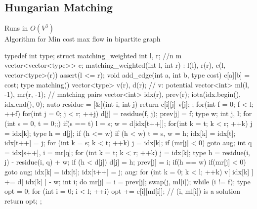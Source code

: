 \documentclass[10pt, landscape, twocolumn, a4paper, notitlepage]{article}
\begin{document}
\subsection{Hungarian Matching}
Runs in $O(V^3)$ \\
Algorithm for Min cost max flow in bipartite graph
\begin{code}
typedef int type;
struct matching_weighted {
  int l, r; //n m
  vector<vector<type>> c;
  matching_weighted(int l, int r) : l(l), r(r), c(l, vector<type>(r)) {
    assert(l <= r);
  }
  void add_edge(int a, int b, type cost) { c[a][b] = cost; }
  type matching() {
    vector<type> v(r), d(r); // v: potential
    vector<int> ml(l, -1), mr(r, -1); // matching pairs
    vector<int> idx(r), prev(r);
    iota(idx.begin(), idx.end(), 0);
    auto residue = [&](int i, int j) { return c[i][j]-v[j]; };
    for(int f = 0; f < l; ++f) {
      for(int j = 0; j < r; ++j) {
        d[j] = residue(f, j);
        prev[j] = f;
      }
      type w;
      int j, l;
      for (int s = 0, t = 0;;) {
        if(s == t) {
          l = s;
          w = d[idx[t++]];
          for(int k = t; k < r; ++k) {
            j = idx[k];
            type h = d[j];
            if (h <= w) {
              if (h < w) t = s, w = h;
              idx[k] = idx[t];
              idx[t++] = j;
            }
          }
          for (int k = s; k < t; ++k) {
            j = idx[k];
            if (mr[j] < 0) goto aug;
          }
        }
        int q = idx[s++], i = mr[q];
        for (int k = t; k < r; ++k) {
          j = idx[k];
          type h = residue(i, j) - residue(i, q) + w;
          if (h < d[j]) {
            d[j] = h;
            prev[j] = i;
            if(h == w) {
              if(mr[j] < 0) goto aug;
              idx[k] = idx[t];
              idx[t++] = j;
            }
          }
        }
      }
      aug: for (int k = 0; k < l; ++k)
        v[ idx[k] ] += d[ idx[k] ] - w;
      int i;
      do {
        mr[j] = i = prev[j];
        swap(j, ml[i]);
      } while (i != f);
    }
    type opt = 0;
    for (int i = 0; i < l; ++i)
      opt += c[i][ml[i]]; // (i, ml[i]) is a solution
    return opt;
  }
};
\end{code}
\end{document}
